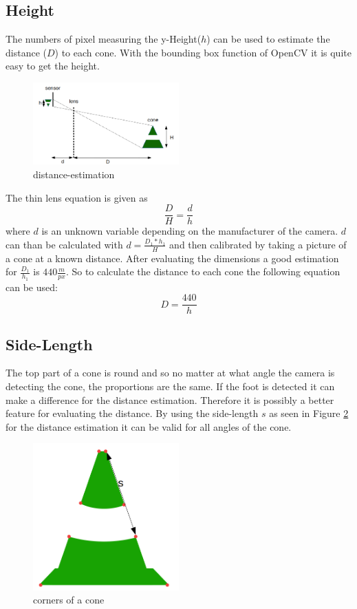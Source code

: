 \documentclass[10pt,a4paper]{article}
\begin{document}
	\subsection{Height} \label{height-estimation}
	The numbers of pixel measuring the y-Height($h$) can be used to estimate the distance ($D$) to each cone. With the bounding box function of OpenCV it is quite easy to get the height. 
	\begin{figure}[h]
		\centering
		\includegraphics[width=0.5\textwidth]{Abb/distance-estimation.png}
		\caption{distance-estimation}
		\label{distance-estimation}
	\end{figure}
	The thin lens equation is given as
	$$\frac{D}{H}=\frac{d}{h}$$
	where $d$ is an unknown variable depending on the manufacturer of the camera.
	$d$ can than be calculated with $d=\frac{D_1*h_1}{H}$ and then calibrated by taking a picture of a cone at a known distance. After evaluating the dimensions a good estimation for $\frac{D_1}{h_1}$ is $440\frac{m}{px}$.
	So to calculate the distance to each cone the following equation can be used:
	$$D = \frac{440}{h}$$
	
	\subsection{Side-Length}
	The top part of a cone is round and so no matter at what angle the camera is detecting the cone, the proportions are the same. If the foot is detected it can make a difference for the distance estimation. Therefore it is possibly a better feature for evaluating the distance.
	By using the side-length $s$ as seen in Figure \ref{corners} for the distance estimation it can be valid for all angles of the cone.
	
	\begin{figure}[h]
		\centering
		\includegraphics[width=0.5\textwidth]{Abb/corners.png}
		\caption{corners of a cone}
		\label{corners}
	\end{figure}
	
\end{document}

